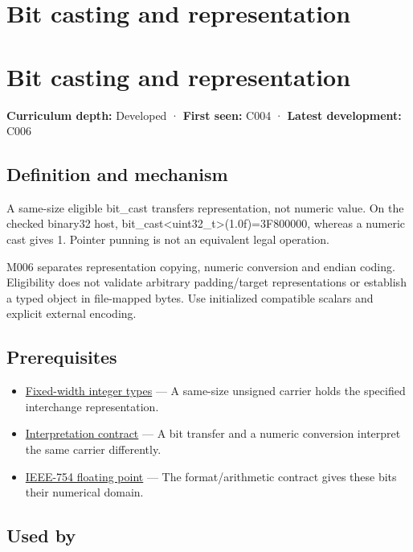\hypertarget{appendix-34ee45f161c1}{}
\section*{Bit casting and representation}
\section{Bit casting and representation}\label{bit-casting-and-representation}

\textbf{Curriculum depth:} Developed · \textbf{First seen:} C004 · \textbf{Latest development:} C006

\subsection{Definition and mechanism}\label{definition-and-mechanism}

A same-size eligible bit\_cast transfers representation, not numeric value. On the checked binary32 host, bit\_cast\textless uint32\_t\textgreater{}(1.0f)=3F800000, whereas a numeric cast gives 1. Pointer punning is not an equivalent legal operation.

M006 separates representation copying, numeric conversion and endian coding. Eligibility does not validate arbitrary padding/target representations or establish a typed object in file-mapped bytes. Use initialized compatible scalars and explicit external encoding.

\subsection{Prerequisites}\label{prerequisites}

\begin{itemize}
\tightlist
\item
  \hyperref[appendix-cc04044b5782]{Fixed-width integer types} --- A same-size unsigned carrier holds the specified interchange representation.
\item
  \hyperref[appendix-f414bd4ed05c]{Interpretation contract} --- A bit transfer and a numeric conversion interpret the same carrier differently.
\item
  \hyperref[appendix-343615f49ddf]{IEEE-754 floating point} --- The format/arithmetic contract gives these bits their numerical domain.
\end{itemize}

\subsection{Used by}\label{used-by}

